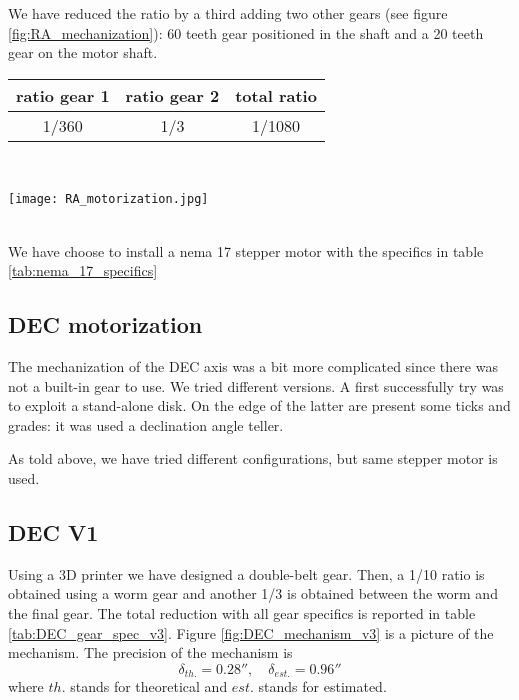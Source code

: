 We have reduced the ratio by a third adding two other gears (see figure \ref{fig:RA_mechanization}): 60 teeth gear positioned in the shaft and a 20 teeth gear on the motor shaft.
\\
\begin{minipage}{.4\textwidth}
    \centering
    \begin{tabular}{cc|c}
        ratio gear 1 & ratio gear 2 & total ratio \\
        \hline
        1/360 & 1/3 & 1/1080 \\
        \hline
    \end{tabular}
    \label{tab:RA_mechanization}
\end{minipage}
\\
\begin{minipage}{.4\textwidth}
    \centering
    \texttt{[image: RA\_motorization.jpg]}  
    \label{fig:RA_mechanization}         
\end{minipage}
\\
We have choose to install a nema 17 stepper motor with the specifics in table \ref{tab:nema_17_specifics}

\subsection{DEC motorization}
The mechanization of the DEC axis was a bit more complicated since there was not a built-in gear to use.
We tried different versions.
A first successfully try was to exploit a stand-alone disk.
On the edge of the latter are present some ticks and grades: it was used a declination angle teller.

As told above, we have tried different configurations, but same stepper motor is used.

\subsection{DEC V1}
Using a 3D printer we have designed a double-belt gear.
Then, a 1/10 ratio is obtained using a worm gear and another 1/3 is obtained between the worm and the final gear.
The total reduction with all gear specifics is reported in table \ref{tab:DEC_gear_spec_v3}.
Figure \ref{fig:DEC_mechanism_v3} is a picture of the mechanism.
The precision of the mechanism is 
\[\delta_{th.}=0.28'',\quad \delta_{est.}=0.96''\]
where \(th.\) stands for theoretical and \(est.\) stands for estimated.

